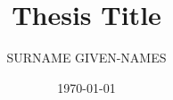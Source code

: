 \documentclass[ieeebib]{class/IGPthesis} %
\title{Thesis Title}
\author{SURNAME GIVEN-NAMES}
\affiliation{Interdisciplinary Graduate Programme \\ Energy Research Institute @ NTU}
\date{\titledate\today}
\begin{document}
    \makefrontmatter

    \cleardoublepage


    \ifdefined\isdraft
        \doublespacing
    \else
        \onehalfspacing
    \fi

    
    
    
    



    \begin{appendices}

        
        

    \end{appendices}
\end{document}
